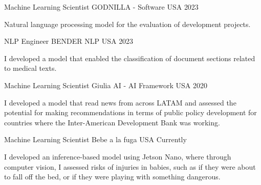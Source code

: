 \newpage
{}


\begin{cventries}

  \cventry
    {Machine Learning Scientist} %
    {GODNILLA - Software} %
    {USA} %
    {2023} %
    {
      \begin{cvitems} %
        \item {Natural language processing model for the evaluation of development projects.}
      \end{cvitems}
    }


  \cventry
    {NLP Engineer} %
    {BENDER NLP} %
    {USA} %
    {2023} %
    {
      \begin{cvitems} %
        \item {I developed a model that enabled the classification of document sections related to medical texts.}
      \end{cvitems}
    }



  \cventry
    {Machine Learning Scientist} %
    {Giulia AI - AI Framework} %
    {USA} %
    {2020} %
    {
      \begin{cvitems} %
        \item {I developed a model that read news from across LATAM and assessed the potential for making recommendations in terms of public policy development for countries where the Inter-American Development Bank was working.}
      \end{cvitems}
    }


  \cventry
    {Machine Learning Scientist} %
    {Bebe a la fuga} %
    {USA} %
    {Currently} %
    {
      \begin{cvitems} %
        \item {I developed an inference-based model using Jetson Nano, where through computer vision, I assessed risks of injuries in babies, such as if they were about to fall off the bed, or if they were playing with something dangerous.}
      \end{cvitems}
    }

\end{cventries}



